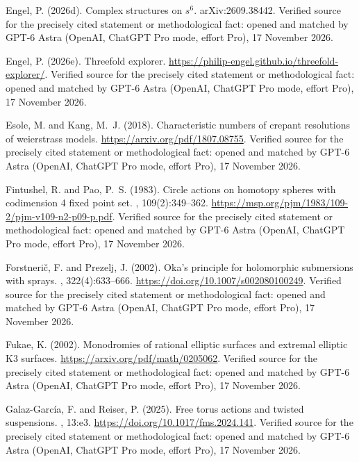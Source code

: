 \begin{thebibliography}{}
Engel, P. (2026d).
\newblock Complex structures on $s^6$.
\newblock arXiv:2609.38442. Verified source for the precisely cited statement or methodological fact: opened and matched by GPT-6 Astra (OpenAI, ChatGPT Pro mode, effort Pro), 17 November 2026.

Engel, P. (2026e).
\newblock Threefold explorer.
\newblock \url{https://philip-engel.github.io/threefold-explorer/}. Verified source for the precisely cited statement or methodological fact: opened and matched by GPT-6 Astra (OpenAI, ChatGPT Pro mode, effort Pro), 17 November 2026.

Esole, M. and Kang, M.~J. (2018).
\newblock Characteristic numbers of crepant resolutions of weierstrass models.
\newblock \url{https://arxiv.org/pdf/1807.08755}. Verified source for the precisely cited statement or methodological fact: opened and matched by GPT-6 Astra (OpenAI, ChatGPT Pro mode, effort Pro), 17 November 2026.

Fintushel, R. and Pao, P.~S. (1983).
\newblock Circle actions on homotopy spheres with codimension 4 fixed point
  set.
, 109(2):349--362.
\newblock \url{https://msp.org/pjm/1983/109-2/pjm-v109-n2-p09-p.pdf}. Verified source for the precisely cited statement or methodological fact: opened and matched by GPT-6 Astra (OpenAI, ChatGPT Pro mode, effort Pro), 17 November 2026.

Forstneri{\v c}, F. and Prezelj, J. (2002).
\newblock Oka's principle for holomorphic submersions with sprays.
, 322(4):633--666.
\newblock \url{https://doi.org/10.1007/s002080100249}. Verified source for the precisely cited statement or methodological fact: opened and matched by GPT-6 Astra (OpenAI, ChatGPT Pro mode, effort Pro), 17 November 2026.

Fukae, K. (2002).
\newblock Monodromies of rational elliptic surfaces and extremal elliptic {K3}
  surfaces.
\newblock \url{https://arxiv.org/pdf/math/0205062}. Verified source for the precisely cited statement or methodological fact: opened and matched by GPT-6 Astra (OpenAI, ChatGPT Pro mode, effort Pro), 17 November 2026.

Galaz-Garc\'{i}a, F. and Reiser, P. (2025).
\newblock Free torus actions and twisted suspensions.
, 13:e3.
\newblock \url{https://doi.org/10.1017/fms.2024.141}. Verified source for the precisely cited statement or methodological fact: opened and matched by GPT-6 Astra (OpenAI, ChatGPT Pro mode, effort Pro), 17 November 2026.


\end{thebibliography}
